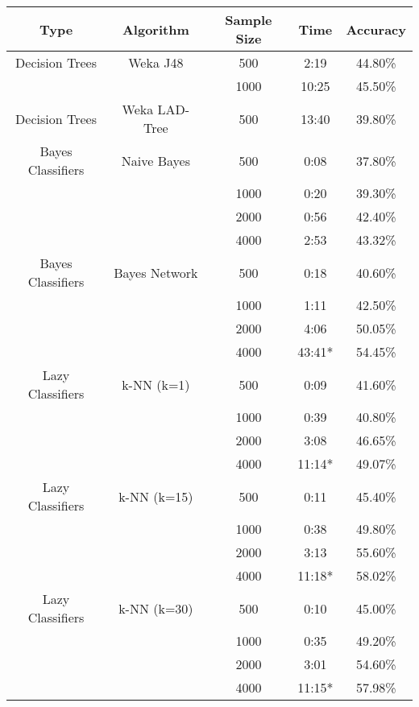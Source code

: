 \begin{tabular}{|c|c|c|c|c|}
\hline
Type     &       Algorithm    & Sample Size &  Time &  Accuracy   \\
\hline
\hline
Decision Trees & Weka J48      &   500  &   2:19  &    44.80\%  \\
                              &&  1000  &  10:25  &    45.50\%  \\
Decision Trees & Weka LAD-Tree &   500  &  13:40  &    39.80\%  \\

Bayes Classifiers & Naive Bayes &   500  &   0:08  &    37.80\%  \\
                               &&  1000  &   0:20  &    39.30\%  \\
                               &&  2000  &   0:56  &    42.40\%  \\
                               &&  4000  &   2:53  &    43.32\%  \\

Bayes Classifiers & Bayes Network &   500  &  0:18  &   40.60\%  \\
                                 &&  1000  &  1:11  &   42.50\%  \\
                                 &&  2000  &  4:06  &   50.05\%  \\
                                 &&  4000  & 43:41* &   54.45\%  \\

Lazy Classifiers & k-NN (k=1) &   500  &   0:09  &    41.60\%  \\
                             &&  1000  &   0:39  &    40.80\%  \\
                             &&  2000  &   3:08  &    46.65\%  \\
                             &&  4000  &  11:14* &    49.07\%  \\

Lazy Classifiers & k-NN (k=15) &   500  &   0:11  &    45.40\%  \\
                              &&  1000  &   0:38  &    49.80\%  \\
                              &&  2000  &   3:13  &    55.60\%  \\
                              &&  4000  &  11:18* &    58.02\%  \\

Lazy Classifiers & k-NN (k=30) &   500  &   0:10  &    45.00\%  \\
                              &&  1000  &   0:35  &    49.20\%  \\
                              &&  2000  &   3:01  &    54.60\%  \\
                              &&  4000  &  11:15* &    57.98\%  \\


\end{tabular}
